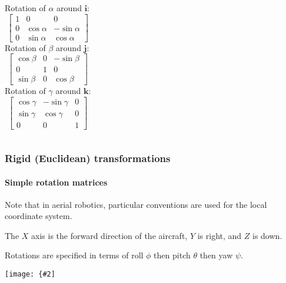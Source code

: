 \documentclass[aspectratio=169]{beamer}
\renewcommand{\vec}[1]{\boldsymbol{#1}}
\newcommand{\myfig}[3]{\centerline{\texttt{[image: \{\#2]}}}
    \centerline{\scriptsize #3}}
\begin{document}
\begin{frame}
\begin{columns}
\column{1.5in}
Rotation of $\alpha$ around $\vec{i}$:
\begin{equation*}
\begin{bmatrix}
1 & 0 & 0 \\
0 & \cos \alpha & -\sin \alpha \\
0 & \sin \alpha & \cos \alpha
\end{bmatrix}
\end{equation*}
\column{1.5in}
Rotation of $\beta$ around $\vec{j}$:
\begin{equation*}
\begin{bmatrix}
\cos \beta & 0 & -\sin \beta \\
0 & 1 & 0 \\
\sin \beta & 0 & \cos \beta
\end{bmatrix}
\end{equation*}
\column{1.5in}
Rotation of $\gamma$ around $\vec{k}$:
\begin{equation*}
\begin{bmatrix}
\cos \gamma & -\sin \gamma & 0 \\
\sin \gamma & \cos \gamma & 0 \\
0 & 0 & 1
\end{bmatrix}
\end{equation*}
\end{columns}
\end{frame}


\begin{frame}
\frametitle{Rigid (Euclidean) transformations}
\framesubtitle{Simple rotation matrices}

Note that in \alert{aerial robotics},
particular conventions are used for the
local coordinate system.

\medskip

The $X$ axis is the forward direction of the aircraft,
$Y$ is right, and $Z$ is down.

\medskip

Rotations are specified in terms of roll $\phi$ then
pitch $\theta$ then yaw $\psi$.

\myfig{2.5in}{Rollpitchyawplain}{\url{http://en.wikipedia.org/wiki/File:Rollpitchyawplain.png}}

\end{frame}
\end{document}
